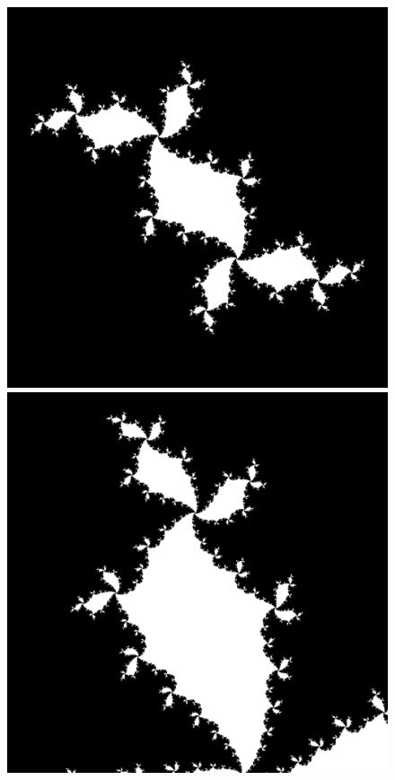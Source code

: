 \documentclass[12pt]{article}
\theoremstyle{plain}
\begin{document}
\newpage
\begin{figure}[H]
\begin{minipage}[c][0.24\width]{
   0.24\textwidth}
   \centering
   \includegraphics[width=.8\textwidth]{figure/section4/Julia-1.png}
\end{minipage}
\begin{minipage}[c][0.24\width]{
   0.24\textwidth}
   \centering
   \includegraphics[width=.8\textwidth]{figure/section4/Julia-2.png}
\end{minipage}
\begin{minipage}[c][0.24\width]{
   0.24\textwidth}
   \centering

\end{minipage}
\end{figure}
\end{document}
